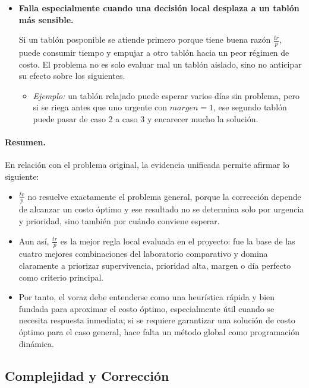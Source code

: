 \documentclass[12pt,a4paper]{article}
\begin{document}
\begin{itemize}
  \item \textbf{Falla especialmente cuando una decisi\'on local desplaza a un tabl\'on m\'as sensible.}

  Si un tabl\'on posponible se atiende primero porque tiene buena raz\'on \(\frac{tr}{p}\), puede consumir tiempo y empujar a otro tabl\'on hacia un peor r\'egimen de costo. El problema no es solo evaluar mal un tabl\'on aislado, sino no anticipar su efecto sobre los siguientes.

  \begin{itemize}
    \setlength{\itemsep}{0.2em}
    \item \textit{Ejemplo:} un tabl\'on relajado puede esperar varios d\'ias sin problema, pero si se riega antes que uno urgente con \(margen=1\), ese segundo tabl\'on puede pasar de caso 2 a caso 3 y encarecer mucho la soluci\'on.
  \end{itemize}
\end{itemize}

\paragraph{Resumen.}
En relaci\'on con el problema original, la evidencia unificada permite afirmar lo siguiente:

\begin{itemize}
  \item \(\frac{tr}{p}\) no resuelve exactamente el problema general, porque la correcci\'on depende de alcanzar un costo \'optimo y ese resultado no se determina solo por urgencia y prioridad, sino tambi\'en por cu\'ando conviene esperar.
  \item Aun as\'i, \(\frac{tr}{p}\) es la mejor regla local evaluada en el proyecto: fue la base de las cuatro mejores combinaciones del laboratorio comparativo y domina claramente a priorizar supervivencia, prioridad alta, margen o d\'ia perfecto como criterio principal.
  \item Por tanto, el voraz debe entenderse como una heur\'istica r\'apida y bien fundada para aproximar el costo \'optimo, especialmente \'util cuando se necesita respuesta inmediata; si se requiere garantizar una soluci\'on de costo \'optimo para el caso general, hace falta un m\'etodo global como programaci\'on din\'amica.
\end{itemize}

\subsection{Complejidad y Correcci\'on}
\end{document}
